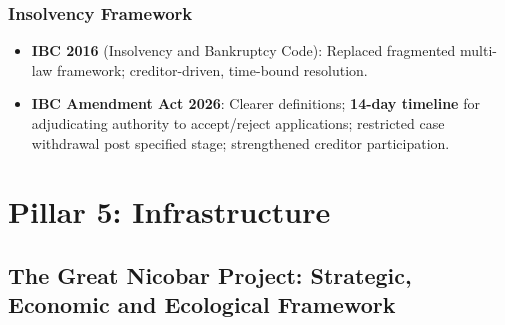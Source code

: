 \subsubsection*{Insolvency Framework}
\begin{itemize}
  \item \textbf{IBC 2016} (Insolvency and Bankruptcy Code): Replaced fragmented multi-law framework; creditor-driven, time-bound resolution.
  \item \textbf{IBC Amendment Act 2026}: Clearer definitions; \textbf{14-day timeline} for adjudicating authority to accept/reject applications; restricted case withdrawal post specified stage; strengthened creditor participation.
\end{itemize}

\section{Pillar 5: Infrastructure}
\subsection{The Great Nicobar Project: Strategic, Economic and Ecological Framework}

